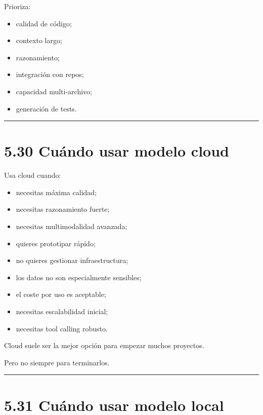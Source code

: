 Prioriza:

\begin{itemize}
\tightlist
\item
  calidad de código;
\item
  contexto largo;
\item
  razonamiento;
\item
  integración con repos;
\item
  capacidad multi-archivo;
\item
  generación de tests.
\end{itemize}

\begin{center}\rule{0.5\linewidth}{0.5pt}\end{center}

\section{5.30 Cuándo usar modelo
cloud}\label{cuuxe1ndo-usar-modelo-cloud}

Usa cloud cuando:

\begin{itemize}
\tightlist
\item
  necesitas máxima calidad;
\item
  necesitas razonamiento fuerte;
\item
  necesitas multimodalidad avanzada;
\item
  quieres prototipar rápido;
\item
  no quieres gestionar infraestructura;
\item
  los datos no son especialmente sensibles;
\item
  el coste por uso es aceptable;
\item
  necesitas escalabilidad inicial;
\item
  necesitas tool calling robusto.
\end{itemize}

Cloud suele ser la mejor opción para empezar muchos proyectos.

Pero no siempre para terminarlos.

\begin{center}\rule{0.5\linewidth}{0.5pt}\end{center}

\section{5.31 Cuándo usar modelo
local}\label{cuuxe1ndo-usar-modelo-local}

